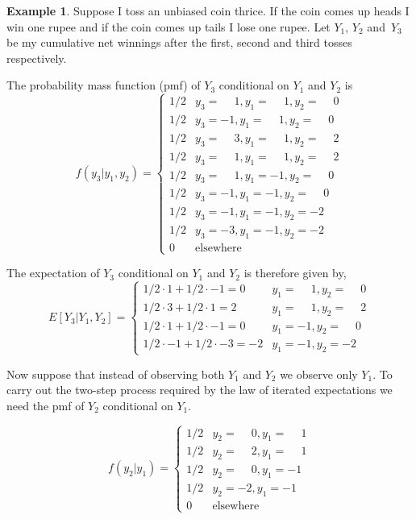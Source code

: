 \documentclass[12pt,reqno,openany]{amsbook}
\theoremstyle{plain}
\theoremstyle{definition}
\newtheorem{exmp}{Example}[chapter]
\begin{document}
\begin{exmp}\label{exmp:three-toss-conex}
Suppose I toss an unbiased coin thrice. If the coin comes up heads I
win one rupee and if the coin comes up tails I lose one rupee. Let
$Y_1$, $Y_2$ and~$Y_3$ be my cumulative net winnings after the first,
second and third tosses respectively.

The probability mass function (pmf) of $Y_3$ conditional on $Y_1$ and $Y_2$ is
\[f(y_3|y_1,y_2)=
\begin{cases}
1/2&y_3=\phantom{-}1,y_1=\phantom{-}1,y_2=\phantom{-}0\\
1/2&y_3=-1,y_1=\phantom{-}1,y_2=\phantom{-}0\\
1/2&y_3=\phantom{-}3,y_1=\phantom{-}1,y_2=\phantom{-}2\\
1/2&y_3=\phantom{-}1,y_1=\phantom{-}1,y_2=\phantom{-}2\\
1/2&y_3=\phantom{-}1,y_1=-1,y_2=\phantom{-}0\\
1/2&y_3=-1,y_1=-1,y_2=\phantom{-}0\\
1/2&y_3=-1,y_1=-1,y_2=-2\\
1/2&y_3=-3,y_1=-1,y_2=-2\\
0&\text{elsewhere}
\end{cases}\]

The expectation of $Y_3$ conditional on $Y_1$ and $Y_2$ is therefore
given by,
\[E[Y_3|Y_1,Y_2]=
\begin{cases}
1/2\cdot 1+1/2 \cdot -1=0&y_1=\phantom{-}1,y_2=\phantom{-}0\\
1/2\cdot 3+1/2 \cdot 1 =2&y_1=\phantom{-}1,y_2=\phantom{-}2\\
1/2\cdot 1+1/2\cdot -1 =0&y_1=-1,y_2=\phantom{-}0\\
1/2\cdot -1+1/2\cdot -3=-2&y_1=-1,y_2=-2
\end{cases}\]

Now suppose that instead of observing both $Y_1$ and $Y_2$ we observe
only $Y_1$. To carry out the two-step process required by the law of
iterated expectations we need the pmf of $Y_2$ conditional on $Y_1$.

\[f(y_2|y_1)=
\begin{cases}
1/2 & y_2 = \phantom{-}0, y_1=\phantom{-}1\\
1/2 & y_2 = \phantom{-}2, y_1=\phantom{-}1\\
1/2 & y_2 = \phantom{-}0, y_1=-1\\
1/2 & y_2 = -2, y_1=-1\\
0 & \text{elsewhere}
\end{cases}\]


\end{exmp}
\end{document}
